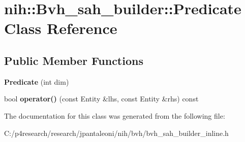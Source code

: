 \hypertarget{classnih_1_1_bvh__sah__builder_1_1_predicate}{
\section{nih\-:\-:\-Bvh\-\_\-sah\-\_\-builder\-:\-:\-Predicate \-Class \-Reference}
\label{classnih_1_1_bvh__sah__builder_1_1_predicate}
}
\subsection*{\-Public \-Member \-Functions}
\begin{DoxyCompactItemize}
\item 
\hypertarget{classnih_1_1_bvh__sah__builder_1_1_predicate_a67096095fdc5857247eac7490ef8dfa5}{
{\bfseries \-Predicate} (int dim)}
\label{classnih_1_1_bvh__sah__builder_1_1_predicate_a67096095fdc5857247eac7490ef8dfa5}

\item 
\hypertarget{classnih_1_1_bvh__sah__builder_1_1_predicate_aceb53e7cff77cab9ccf1782cf4d4eb01}{
bool {\bfseries operator()} (const \-Entity \&lhs, const \-Entity \&rhs) const }
\label{classnih_1_1_bvh__sah__builder_1_1_predicate_aceb53e7cff77cab9ccf1782cf4d4eb01}

\end{DoxyCompactItemize}


\-The documentation for this class was generated from the following file\-:\begin{DoxyCompactItemize}
\item 
\-C\-:/p4research/research/jpantaleoni/nih/bvh/bvh\-\_\-sah\-\_\-builder\-\_\-inline.\-h\end{DoxyCompactItemize}
